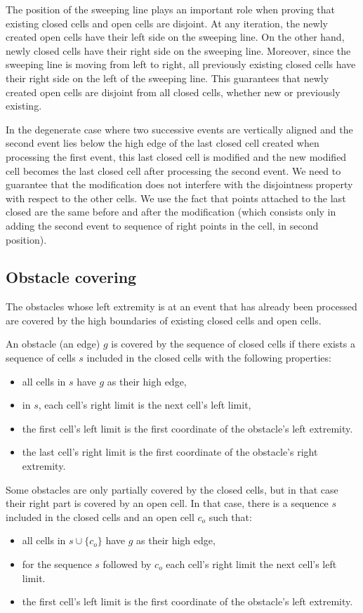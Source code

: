 \documentclass[a4paper, USenglish, cleveref, autoref, thm-restate]{lipics-v2021}
\begin{document}
The position of the sweeping line plays an important role when proving
that existing closed cells and open cells are disjoint.  At any
iteration, the newly created open cells have their left side on the
sweeping line.  On the other hand, newly closed cells have their right
side on the sweeping line.  Moreover, since the sweeping line is moving
from left to right, all previously existing closed cells have their
right side on the left of the sweeping line.  This guarantees that newly
created open cells are disjoint from all closed cells, whether new or
previously existing.

In the degenerate case where two successive events are vertically
aligned and the second event lies below the high edge of the last
closed cell created when processing the first event, this last closed
cell is modified and the new modified cell becomes the last closed
cell after processing the second event.  We need to guarantee that
the modification does not interfere with the disjointness property with
respect to the other cells.  We use the fact that
points attached to the last closed are the same before and after the
modification (which consists only in adding the second event to
sequence of right points in the cell, in second position).
\subsection{Obstacle covering}
The obstacles whose left extremity is at an event that has already been
processed are covered by the high boundaries of existing closed cells and
open cells.

An obstacle (an edge) \(g\) is covered by the sequence of closed cells if
there exists a sequence of cells \(s\) included in the closed cells
with the following properties:
\begin{itemize}
\item all cells in \(s\) have \(g\) as their high edge,
\item in \(s\), each cell's right limit is the next cell's left limit,
\item the first cell's left limit is the first coordinate of the obstacle's
  left extremity.
\item the last cell's right limit is the first coordinate of the obstacle's
  right extremity.
\end{itemize}
Some obstacles are only partially covered by the closed cells, but in that
case their right part is covered by an open cell.  In that case, there
is a sequence \(s\) included in the closed cells
and an open cell \(c_o\) such that:
\begin{itemize}
\item all cells in \(s \cup \{c_o\}\) have \(g\) as their high edge,
\item for the sequence \(s\) followed by \(c_o\) each cell's right limit
  the next cell's left limit.
\item the first cell's left limit is the first coordinate of the obstacle's
  left extremity.
\end{itemize}
\end{document}
